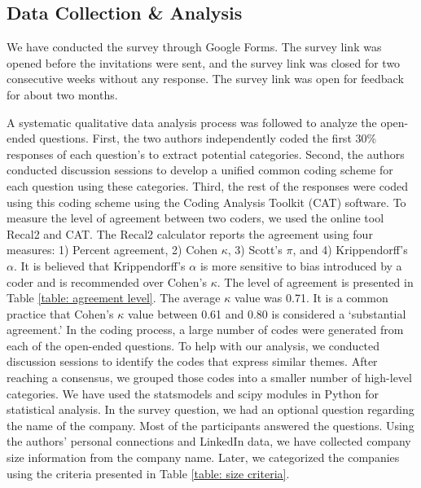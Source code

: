 \subsection{Data Collection \& Analysis}
\label{survey_data_collection}
We have conducted the survey through Google Forms. The survey link was opened before the invitations were sent, and the survey link was closed for two consecutive weeks without any response. The survey link was open for feedback for about two months. 

A systematic qualitative data analysis process was followed to analyze the open-ended questions. First, the two authors independently coded the first 30\% responses of each question's to extract potential categories. Second, the authors conducted discussion sessions to develop a unified common coding scheme for each question using these categories. Third, the rest of the responses were coded using this coding scheme using the Coding Analysis Toolkit (CAT)\cite{Lu2008} software. To measure the level of agreement between two coders, we used the online tool Recal2\cite{Recal2020} and CAT\cite{Lu2008}. The Recal2 calculator reports the agreement using four measures: 1) Percent agreement, 2) Cohen $\kappa$\cite{Cohen1960}, 3) Scott’s $\pi$\cite{scott1955}, and 4) Krippendorff’s $\alpha$\cite{krippendorff2004}. It is believed that Krippendorff’s $\alpha$ is more sensitive to bias introduced by a coder and is recommended\cite{Joyce2013} over Cohen's $\kappa$\cite{Cohen1960}. The level of agreement is presented in Table \ref{table: agreement level}. The average $\kappa$ value was 0.71. It is a common practice that Cohen's $\kappa$ value between 0.61 and 0.80\cite{Landis1977} is considered a `substantial agreement.’ In the coding process, a large number of codes were generated from each of the open-ended questions. To help with our analysis, we conducted discussion sessions to identify the codes that express similar themes. After reaching a consensus, we grouped those codes into a smaller number of high-level categories. We have used the statsmodels\cite{seabold2010} and scipy\cite{scipy2020} modules in Python for statistical analysis. In the survey question, we had an optional question regarding the name of the company. Most of the participants answered the questions. Using the authors' personal connections and LinkedIn data, we have collected company size information from the company name. Later, we categorized the companies using the criteria presented in Table \ref{table: size criteria}.
